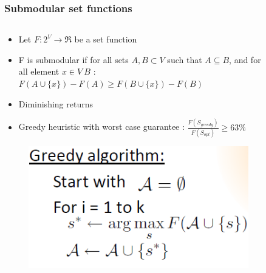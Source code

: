 \documentclass[xcolor=dvipsnames]{beamer}
\begin{document}
\begin{frame}
	\frametitle{Submodular set functions}
	
	\begin{columns}
		\begin{column}{.6\textwidth}
			\begin{itemize}
				\item Let $F:2^V \longrightarrow \Re$ be a set function
				\item F is submodular if for all sets $A,B \subset V$ such that $A \subseteq B$, and for all element $x \in V \ B $ : $ F(A \cup \{x\})-F(A) \geq F(B \cup \{x\})-F(B) $
				\item Diminishing returns
				\item Greedy heuristic with worst case guarantee : $\frac{F(S_{greedy})}{F(S_{opt})} \geq 63\%$
			\end{itemize}
			\begin{figure}		
				\includegraphics[scale=.5]{greedy}
			\end{figure}
	  	\end{column}
	  	\begin{column}{.4\textwidth}
	  		\begin{figure}

\end{figure}
\end{column}
\end{columns}
\end{frame}
\end{document}
